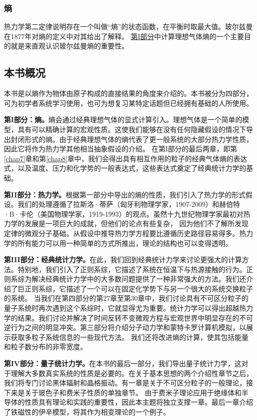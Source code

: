 \documentclass[UTF8]{ctexart}
\numberwithin{equation}{section}%
\numberwithin{figure}{section}%
\begin{document}
    \subsubsection{熵}
    热力学第二定律说明存在一个叫做“熵”的状态函数，在平衡时取最大值。玻尔兹曼在1877年对熵的定义中对其给出了解释。
    \hyperref[part1]{第I部分}中计算理想气体熵的一个主要目的就是来直观认识玻尔兹曼熵的重要性。
    
    \subsection{本书概况}
    本书是以熵作为物体由原子构成的直接结果的角度来介绍的。本书被分为四部分，可为初学者系统学习使用，也可为想复习某特定话题但已经拥有基础的人所使用。

    \textbf{第I部分：熵。}熵会通过经典理想气体的显式计算引入。理想气体是一个简单的模型，具有可以精确计算的宏观性质。这使我们能够在没有任何隐藏假设的情况下导出封闭形式的熵。由于经典理想气体的熵代表了更一般系统的大部分热力学性质，因此它将作为热力学其他相当抽象假设的介绍。
    在第I部分的最后两章，即第\ref{chap7}章和第\ref{chap8}章中，我们会得出具有相互作用的粒子的经典气体熵的表达式，以及温度、压力和化学势的一般表达式，这些表达式奠定了经典统计力学的基础。

    \textbf{第II部分：热力学。}根据第一部分中导出的熵的性质，我们引入了热力学的形式假设。我们的处理遵循了拉斯洛·蒂萨（匈牙利物理学家，1907-2009）和赫伯特·B·卡伦（美国物理学家，1919-1993）的观点。虽然十九世纪物理学家最初对热力学的发展是一项巨大的成就，但他们的论点有些复杂，
    因为他们不了解所发现定律的微观分子基础。从假设中推导热力学方程要比遵循历史路径容易得多。热力学的所有能力可以用一种简单的方式所推出，理论的结构也可以变得透明。

    \textbf{第III部分：经典统计力学。}在此，我们回到经典统计力学来讨论更强大的计算方法。特别地，我们引入了正则系综，它描述了系统在恒温下与热源接触的行为。正则系综为解决经典统计力学中的大多数问题提供了一种非常强大的方法。我们还介绍了巨正则系综，它描述了一个可以在固定化学势下与另一个很大的系统交换粒子的系统。
    当我们在第四部分的第27章至第30章中，我们讨论具有不可区分粒子的量子系统时再次遇到这个系综时，它就显得尤为重要。统计力学可以得出超越热力学的结果。我们讨论并解决了时间反转不变微观方程与宏观世界中明显存在的不可逆行为之间的明显冲突。第三部分将介绍分子动力学和蒙特卡罗计算机模拟，以展示获取多粒子系统信息的一些现代方法。
    我们还将改进熵的计算，使其包括能量和粒子数分布的非零宽度。

    \textbf{第IV部分：量子统计力学。}在本书的最后一部分，我们导出量子统计力学，这对于理解大多数真实系统的性质是必要的。在关于基本思想的两个介绍性章节之后，我们将专门讨论黑体辐射和晶格振动。有一章是关于不可区分粒子的一般理论，接下来是关于玻色子和费米子性质的单独章节。
    由于费米子理论应用于绝缘体和半导体的性质具有理论和实践的重要性，因此本主题将独立支撑一章。最后一章介绍了铁磁性的伊辛模型，将其作为相变理论的一个例子。
    \clearpage
\end{document}

